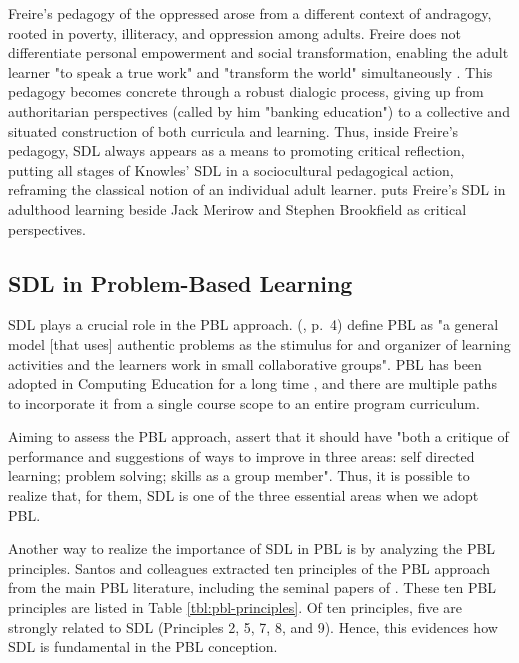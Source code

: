 Freire's pedagogy of the oppressed \cite{freire:2000-oppressed} arose from a different context of andragogy, rooted in poverty, illiteracy, and oppression among adults. Freire does not differentiate personal empowerment and social transformation, enabling the adult learner "to speak a true work" and "transform the world" simultaneously \cite[p.~87]{freire:2000-oppressed}. This pedagogy becomes concrete through a robust dialogic process, giving up from authoritarian perspectives (called by him "banking education") to a collective and situated construction of both curricula and learning. Thus, inside Freire's pedagogy, \gls{SDL} always appears as a means to promoting critical reflection, putting all stages of Knowles' \gls{SDL} in a sociocultural pedagogical action, reframing the classical notion of an individual adult learner.  puts Freire's \gls{SDL} in adulthood learning beside Jack Merirow and Stephen Brookfield as critical perspectives.

\subsection{SDL in Problem-Based Learning}
\label{sdl-relations-ss:pbl}

\gls{SDL} plays a crucial role in the \gls{PBL} approach.  (\citeyear{savery:1995}, p.~4) define \gls{PBL} as "a general model [that uses] authentic problems as the stimulus for and organizer of learning activities and the learners work in small collaborative groups". \gls{PBL} has been adopted in Computing Education for a long time \cite{santos:2021}, and there are multiple paths to incorporate it from a single course scope to an entire program curriculum.

Aiming to assess the \gls{PBL} approach,  assert that it should have "both a critique of performance and suggestions of ways to improve in three areas: self directed learning; problem solving; skills as a group member". Thus, it is possible to realize that, for them, \gls{SDL} is one of the three essential areas when we adopt \gls{PBL}.

Another way to realize the importance of \gls{SDL} in \gls{PBL} is by analyzing the \gls{PBL} principles. Santos and colleagues \cite{santos:2013,santos:2014,santos:2016,arruda:2019} extracted ten principles of the \gls{PBL} approach from the main \gls{PBL} literature, including the seminal papers of . These ten \gls{PBL} principles are listed in Table \ref{tbl:pbl-principles}. Of ten principles, five are strongly related to \gls{SDL} (Principles 2, 5, 7, 8, and 9). Hence, this evidences how \gls{SDL} is fundamental in the \gls{PBL} conception.

